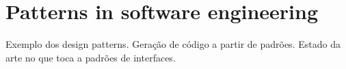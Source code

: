 \section{Patterns in software engineering}
Exemplo dos design patterns. Geração de código a partir de padrões.
Estado da arte no que toca a padrões de interfaces.